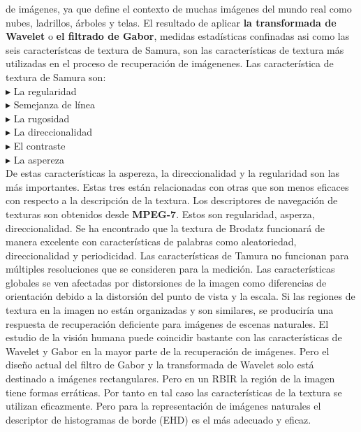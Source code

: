 \documentclass{llncs}
\begin{document}
de im\'agenes, ya que define el contexto de muchas im\'agenes del mundo real como nubes, ladrillos, \'arboles y telas. El resultado
de aplicar \textbf{la transformada de Wavelet}    o \textbf{el filtrado de Gabor}, medidas estad\'isticas confinadas asi como las
seis caracter\'istcas de textura de Samura, son las caracter\'isticas de textura m\'as utilizadas en el proceso de recuperaci\'on de 
im\'agenenes.  Las caracter\'istica de textura de Samura son:\\
$\blacktriangleright $ La regularidad\\
$\blacktriangleright $ Semejanza de l\'inea\\
$\blacktriangleright $ La rugosidad\\
$\blacktriangleright $ La direccionalidad\\
$\blacktriangleright $ El contraste\\
$\blacktriangleright $ La aspereza\\

De estas caracter\'isticas la aspereza, la direccionalidad y la regularidad son las m\'as importantes. Estas tres est\'an relacionadas 
con otras que son menos eficaces con respecto a la descripci\'on de la textura. Los descriptores de navegaci\'on de texturas son 
obtenidos desde \textbf{MPEG-7}. Estos son regularidad, asperza, direccionalidad. Se ha encontrado que la textura de Brodatz funcionar\'a
de manera excelente con caracter\'isticas de palabras como aleatoriedad, direccionalidad y periodicidad. Las caracter\'isticas de Tamura
no funcionan para m\'ultiples resoluciones que se consideren para la medici\'on. Las caracter\'isticas globales se ven afectadas por 
distorsiones de la imagen como diferencias de orientaci\'on debido a la distorsi\'on del punto de vista y la escala. Si las regiones
de textura en la imagen no est\'an organizadas y son similares, se producir\'ia una respuesta de recuperaci\'on deficiente para im\'agenes
de escenas naturales. El estudio de la visi\'on humana puede coincidir bastante con las caracter\'isticas de Wavelet y Gabor en la mayor 
parte de la recuperaci\'on de im\'agenes. Pero el dise\~{n}o actual del filtro de Gabor y la transformada de Wavelet solo est\'a 
destinado a im\'agenes rectangulares. Pero en un RBIR la regi\'on  de la imagen tiene formas err\'aticas. Por tanto en tal caso las 
caracter\'isticas de la textura se utilizan eficazmente. Pero para la representaci\'on de im\'agenes naturales el descriptor de histogramas
de borde (EHD) es el m\'as adecuado y eficaz.
\end{document}
